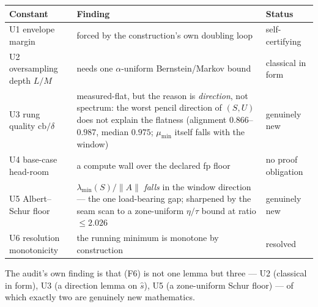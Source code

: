 \documentclass[11pt,a4paper]{article}
\begin{document}
\begin{center}\small
\begin{tabularx}{\linewidth}{@{}lY l@{}}
\toprule
\textbf{Constant} & \textbf{Finding} & \textbf{Status}\\
\midrule
U1 envelope margin & forced by the construction's own doubling loop & self-certifying\\
U2 oversampling depth $L/M$ & needs one $\alpha$-uniform Bernstein/Markov bound & classical in form\\
U3 rung quality $\mathrm{cb}/\delta$ & measured-flat, but the reason is \emph{direction}, not
spectrum: the worst pencil direction of $(S,U)$ does not explain the flatness (alignment
$0.866$--$0.987$, median $0.975$; $\mu_{\min}$ itself falls with the window) & genuinely new\\
U4 base-case head-room & a compute wall over the declared fp floor & no proof obligation\\
U5 Albert--Schur floor & $\lambda_{\min}(S)/\|A\|$ \emph{falls} in the window direction --- the one
load-bearing gap; sharpened by the seam scan to a zone-uniform $\eta/\tau$ bound at ratio
$\le2.026$ & genuinely new\\
U6 resolution monotonicity & the running minimum is monotone by construction & resolved\\
\bottomrule
\end{tabularx}
\end{center}

\noindent The audit's own finding is that (F6) is not one lemma but three --- U2 (classical in
form), U3 (a direction lemma on $\hat s$), U5 (a zone-uniform Schur floor) --- of which exactly two
are genuinely new mathematics.
\end{document}
